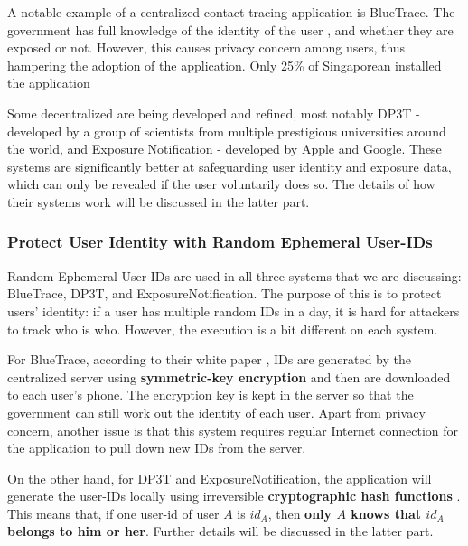         \par A notable example of a centralized contact tracing application is BlueTrace. The government has full knowledge of the identity of the user \cite{BlueTrace1}, and whether they are exposed or not. However, this causes privacy concern among users, thus hampering the adoption of the application. Only 25\% of Singaporean installed the application \cite{UserAcceptance2}

        \par Some decentralized are being developed and refined, most notably DP3T - developed by a group of scientists from multiple prestigious universities around the world, and Exposure Notification - developed by Apple and Google. These systems are significantly better at safeguarding user identity and exposure data, which can only be revealed if the user voluntarily does so. The details of how their systems work will be discussed in the latter part.
  
  \subsubsection{Protect User Identity with Random Ephemeral User-IDs}
    \par Random Ephemeral User-IDs are used in all three systems that we are discussing: BlueTrace, DP3T, and ExposureNotification. The purpose of this is to protect users' identity: if a user has multiple random IDs in a day, it is hard for attackers to track who is who. However, the execution is a bit different on each system.
    \par For BlueTrace, according to their white paper \cite{BlueTrace1}, IDs are generated by the centralized server using \textbf{symmetric-key encryption} and then are downloaded to each user's phone. The encryption key is kept in the server so that the government can still work out the identity of each user. Apart from privacy concern, another issue is that this system requires regular Internet connection for the application to pull down new IDs from the server.
    \par On the other hand, for DP3T and ExposureNotification, the application will generate the user-IDs locally using irreversible \textbf{cryptographic hash functions} \cite{DP3T1} \cite{ExpoNoti2}. This means that, if one user-id of user $A$ is $id_{A}$, then \textbf{only $A$ knows that $id_{A}$ belongs to him or her}. Further details will be discussed in the latter part.

